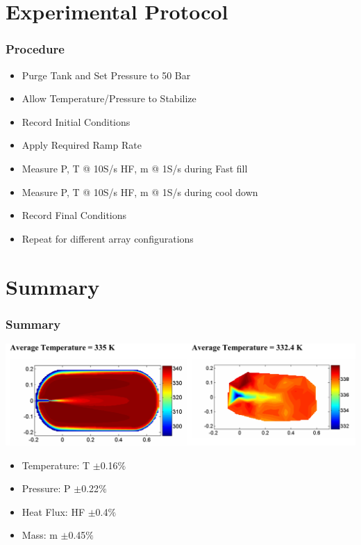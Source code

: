 \documentclass[10pt]{beamer}
\begin{document}
\section{Experimental Protocol}

\begin{frame}
\frametitle{Procedure}
\begin{itemize}
\item Purge Tank and Set Pressure to 50 Bar
\item Allow Temperature/Pressure to Stabilize 
\item Record Initial Conditions
\item Apply Required Ramp Rate
\item Measure P, T @ 10S/s HF, m @ 1S/s during Fast fill
\item Measure P, T @ 10S/s HF, m @ 1S/s during cool down
\item Record Final Conditions
\item Repeat for different array configurations
\end{itemize}
\end{frame}



\section{Summary}
\begin{frame}
\frametitle{Summary}
\includegraphics[height=0.25\textwidth]{fin}




\begin{itemize}
      \item Temperature: T $\pm$0.16$\%$
      \item Pressure: P $\pm$0.22$\%$
      \item Heat Flux: HF $\pm$0.4$\%$
      \item Mass: m $\pm$0.45$\%$
      \end{itemize}
\end{frame}
\end{document}
